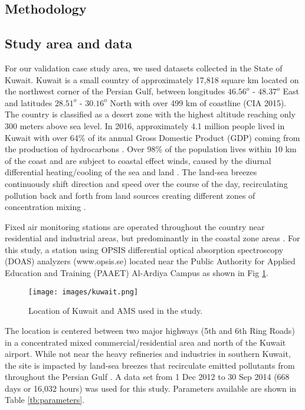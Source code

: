 \documentclass[preprint,12pt,a4paper,authoryear]{elsarticle}
\begin{document}
\begin{linenumbers}
\section{Methodology}

\subsection{Study area and data}
For our validation case study area, we used datasets collected in the State of Kuwait. Kuwait is a small country of approximately 17,818 square km located on the northwest corner of the Persian Gulf, between longitudes $46.56^{o}$ - $48.37^{o}$ East and latitudes $28.51^{o}$ - $30.16^{o}$ North with over 499 km of coastline (CIA 2015).  The country is classified as a desert zone with the highest altitude reaching only 300 meters above sea level. In 2016, approximately 4.1 million people lived in Kuwait \citep{CSB2016} with over 64\% of its annual Gross Domestic Product (GDP) coming from the production of hydrocarbons \citep{KAMCO2013}.  Over 98\% of the population lives within 10 km of the coast and are subject to coastal effect winds, caused by the diurnal differential heating/cooling of the sea and land \citep{Crosman2010, Cuxart2014}.  The land-sea breezes continuously shift direction and speed over the course of the day, recirculating pollution back and forth from land sources creating different zones of concentration mixing \citep{Freeman2016}.

Fixed air monitoring stations are operated throughout the country near residential and industrial areas, but predominantly in the coastal zone areas \citep{Freeman2016a}. For this study, a station using OPSIS differential optical absorption spectroscopy (DOAS) analyzers (www.opsis.se) located near the Public Authority for Applied Education and Training (PAAET) Al-Ardiya Campus as shown in Fig \ref{fig:Kuwait}. 
%
\begin{figure}[H]
\centering
\texttt{[image: images/kuwait.png]}  %
\caption{Location of Kuwait and AMS used in the study.}
\label{fig:Kuwait}
\end{figure}
%
The location is centered between two major highways (5th and 6th Ring Roads) in a concentrated mixed commercial/residential area and north of the Kuwait airport. While not near the heavy refineries and industries in southern Kuwait, the site is impacted by land-sea breezes that recirculate emitted pollutants from throughout the Persian Gulf \citep{Freeman2016}. A data set from 1 Dec 2012 to 30 Sep 2014 (668 days or 16,032 hours) was used for this study. Parameters available are shown in Table \ref{tb:parameters}.
%
\end{linenumbers}
\end{document}
